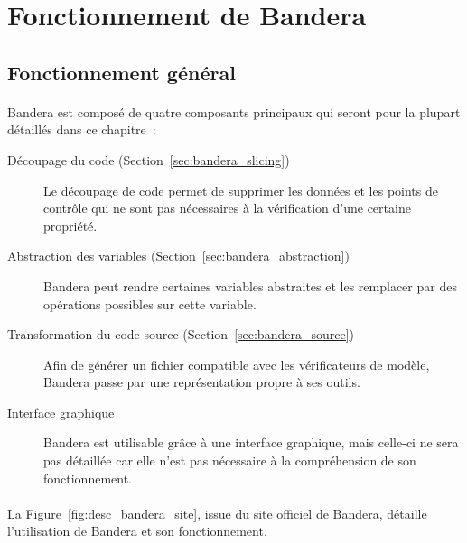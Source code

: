 \section{Fonctionnement de Bandera}
\subsection{Fonctionnement général}

\paragraph{}
Bandera est composé de quatre composants principaux qui seront pour la
plupart détaillés dans ce chapitre~:

\begin{description}
\item[Découpage du code (Section~\ref{sec:bandera_slicing})] Le découpage de code permet de supprimer les
  données et les points de contrôle qui ne sont pas nécessaires à la
  vérification d'une certaine propriété.
\item[Abstraction des variables (Section~\ref{sec:bandera_abstraction})] Bandera peut rendre certaines
  variables abstraites et les remplacer par des opérations possibles
  sur cette variable.
\item[Transformation du code source (Section~\ref{sec:bandera_source})] Afin de générer un fichier
  compatible avec les vérificateurs de modèle, Bandera passe par une
  représentation propre à ses outils.
\item[Interface graphique] Bandera est utilisable grâce à une
  interface graphique, mais celle-ci ne sera pas détaillée car elle
  n'est pas nécessaire à la compréhension de son fonctionnement.
\end{description}

\paragraph{}
La Figure~\ref{fig:desc_bandera_site}, issue du site officiel de
Bandera, détaille l'utilisation de Bandera et son fonctionnement.

